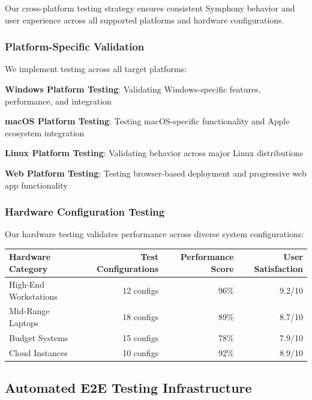 Our cross-platform testing strategy ensures consistent Symphony behavior and user experience across all supported platforms and hardware configurations.

\subsubsection*{Platform-Specific Validation}

We implement testing across all target platforms:

\begin{expandedlist}
    \item \textbf{Windows Platform Testing}: Validating Windows-specific features, performance, and integration
    \item \textbf{macOS Platform Testing}: Testing macOS-specific functionality and Apple ecosystem integration
    \item \textbf{Linux Platform Testing}: Validating behavior across major Linux distributions
    \item \textbf{Web Platform Testing}: Testing browser-based deployment and progressive web app functionality
\end{expandedlist}

\subsubsection*{Hardware Configuration Testing}

Our hardware testing validates performance across diverse system configurations:

\begin{center}
\begin{tabular}{@{}lrrr@{}}
\toprule
\textbf{Hardware Category} & \textbf{Test Configurations} & \textbf{Performance Score} & \textbf{User Satisfaction} \\
\midrule
High-End Workstations & 12 configs & 96\% & 9.2/10 \\
Mid-Range Laptops & 18 configs & 89\% & 8.7/10 \\
Budget Systems & 15 configs & 78\% & 7.9/10 \\
Cloud Instances & 10 configs & 92\% & 8.9/10 \\
\bottomrule
\end{tabular}
\end{center}

\subsection*{Automated E2E Testing Infrastructure}

